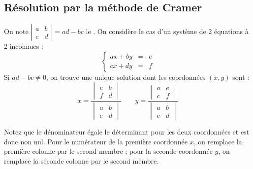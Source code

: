 \documentclass[class=report,crop=false]{standalone}
\begin{document}
\subsection{Résolution par la méthode de Cramer}


On note $\left| \begin{smallmatrix} a & b \\ c & d \end{smallmatrix}\right|=ad-bc$
le . On considère le cas d'un système de $2$ équations à $2$ inconnues :
$$
\left\{\begin{array}{rcl}
a x + b y & = & e\\
c x + d y & = & f
\end{array}\right.
$$
Si $ad-bc\neq 0$, on trouve une unique solution dont les coordonnées $(x,y)$ sont :
$$x = \frac{\begin{vmatrix} e & b \\ f & d \end{vmatrix}}{\begin{vmatrix} a & b \\ c & d \end{vmatrix}} \qquad
y = \frac{\begin{vmatrix} a & e \\ c & f \end{vmatrix}}{\begin{vmatrix} a & b \\ c & d \end{vmatrix}}$$

Notez que le dénominateur égale le déterminant pour les deux coordonnées et est donc non nul.
Pour le numérateur de la première coordonnée $x$, on remplace la première colonne par le second membre ;
pour la seconde coordonnée $y$, on remplace la seconde colonne par le second membre.
\end{document}
